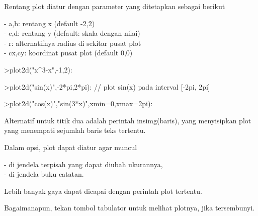 \documentclass{article}
\begin{document}
\begin{eulernotebook}
\begin{eulercomment}
\begin{eulercomment}
\begin{eulercomment}
\begin{eulercomment}
\begin{eulercomment}
\begin{eulercomment}
\begin{eulercomment}
Rentang plot diatur dengan parameter yang ditetapkan sebagai berikut

- a,b: rentang x (default -2,2)\\
- c,d: rentang y (default: skala dengan nilai)\\
- r: alternatifnya radius di sekitar pusat plot\\
- cx,cy: koordinat pusat plot (default 0,0)
\end{eulercomment}
\begin{eulerprompt}
>plot2d("x^3-x",-1,2):
\end{eulerprompt}
\begin{eulerprompt}
>plot2d("sin(x)",-2*pi,2*pi): // plot sin(x) pada interval [-2pi, 2pi]
\end{eulerprompt}
\begin{eulerprompt}
>plot2d("cos(x)","sin(3*x)",xmin=0,xmax=2pi):
\end{eulerprompt}
\begin{eulercomment}
Alternatif untuk titik dua adalah perintah insimg(baris), yang
menyisipkan plot yang menempati sejumlah baris teks tertentu.

Dalam opsi, plot dapat diatur agar muncul

- di jendela terpisah yang dapat diubah ukurannya,\\
- di jendela buku catatan.

Lebih banyak gaya dapat dicapai dengan perintah plot tertentu.

Bagaimanapun, tekan tombol tabulator untuk melihat plotnya, jika
tersembunyi.


\end{eulercomment}
\end{eulercomment}
\end{eulercomment}
\end{eulercomment}
\end{eulercomment}
\end{eulercomment}
\end{eulercomment}
\end{eulernotebook}
\end{document}

